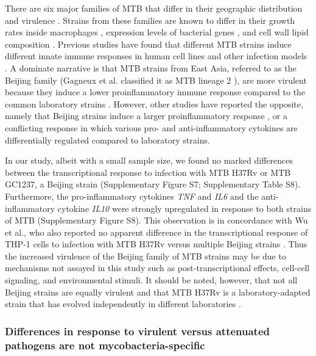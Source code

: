 There are six major families of MTB that differ in their geographic
distribution and virulence \citep{Gagneux2006, Comas2009}. Strains from
these families are known to differ in their growth rates inside
macrophages \citep{Li2002}, expression levels of bacterial genes
\citep{Homolka2010, Rose2013}, and cell wall lipid composition
\citep{Krishnan2011}. Previous studies have found that different MTB
strains induce different innate immune responses in human cell lines and
other infection models \citep{Coscolla2010}. A dominate narrative is that
MTB strains from East Asia, referred to as the Beijing family (Gagneux
et al. classified it as MTB lineage 2 \citep{Gagneux2006}), are more
virulent because they induce a lower proinflammatory immune response
compared to the common laboratory strains \citep{Manca2001, Manca2004;
@Reed2004, Tanveer2009, Wang2010b}. However, other studies have
reported the opposite, namely that Beijing strains induce a larger
proinflammatory response \citep{Chacon-Salinas2005}, or a conflicting
response in which various pro- and anti-inflammatory cytokines are
differentially regulated \citep{Rocha-Ramirez2008, Koo2012} compared to
laboratory strains.

In our study, albeit with a small sample size, we found no marked
differences between the transcriptional response to infection with MTB
H37Rv or MTB GC1237, a Beijing strain (Supplementary Figure S7;
Supplementary Table S8). Furthermore, the pro-inflammatory cytokines
\emph{TNF} and \emph{IL6} and the anti-inflammatory cytokine \emph{IL10}
were strongly upregulated in response to both strains of MTB
(Supplementary Figure S8). This observation is in concordance with Wu et
al., who also reported no apparent difference in the transcriptional
response of THP-1 cells to infection with MTB H37Rv versus multiple
Beijing strains \citep{Wu2012}. Thus the increased virulence of the
Beijing family of MTB strains may be due to mechanisms not assayed in
this study such as post-transcriptional effects, cell-cell signaling,
and environmental stimuli. It should be noted, however, that not all
Beijing strains are equally virulent \citep{Dormans2004, Sinsimer2008}
and that MTB H37Rv is a laboratory-adapted strain that has evolved
independently in different laboratories \citep{Ioerger2010}.

\subsubsection{Differences in response to virulent versus attenuated
pathogens are not
mycobacteria-specific}\label{differences-in-response-to-virulent-versus-attenuated-pathogens-are-not-mycobacteria-specific}

